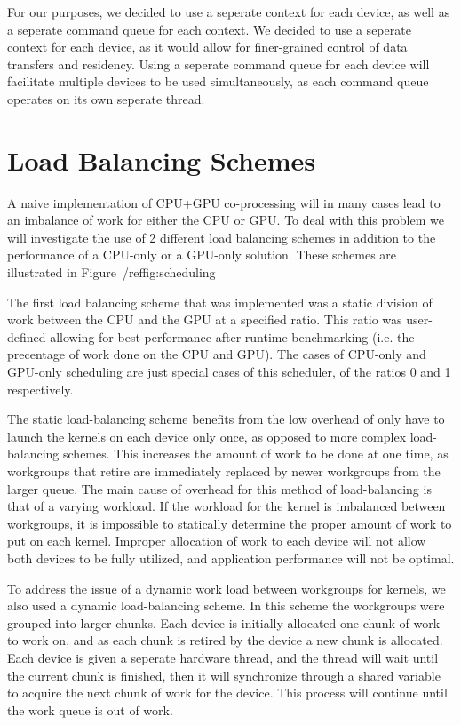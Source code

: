 \documentclass[journal]{IEEEtran}
\begin{document}
For our purposes, we decided to use a seperate context for each device, as well as a seperate
command queue for each context.  We decided to use a seperate context for each device, as it would
allow for finer-grained control of data transfers and residency. Using a seperate command queue
for each device will facilitate multiple devices to be used simultaneously, as each command queue
operates on its own seperate thread.

\section{Load Balancing Schemes}
A naive implementation of CPU+GPU co-processing will in many cases lead to an imbalance
of work for either the CPU or GPU.  To deal with this problem we will investigate the
use of 2 different load balancing schemes in addition to the performance of a CPU-only or
a GPU-only solution.  These schemes are illustrated in Figure~/ref{fig:scheduling}

The first load balancing scheme that was implemented was a static division of work between
the CPU and the GPU at a specified ratio.  This ratio was user-defined allowing for best 
performance after runtime benchmarking (i.e. the precentage of work done on the CPU and GPU).
The cases of CPU-only and GPU-only scheduling are just special cases of this scheduler, of
the ratios 0 and 1 respectively.

The static load-balancing scheme benefits from the low overhead of only have to launch the
kernels on each device only once, as opposed to more complex load-balancing schemes.  This
increases the amount of work to be done at one time, as workgroups that retire are immediately
replaced by newer workgroups from the larger queue. The main cause of overhead for this method
of load-balancing is that of a varying workload.  If the workload for the kernel is imbalanced
between workgroups, it is impossible to statically determine the proper amount of work
to put on each kernel.  Improper allocation of work to each device will not allow both
devices to be fully utilized, and application performance will not be optimal.

To address the issue of a dynamic work load between workgroups for kernels, we also used
a dynamic load-balancing scheme.  In this scheme the workgroups were grouped into larger
chunks.  Each device is initially allocated one chunk of work to work on, and as each chunk
is retired by the device a new chunk is allocated.  Each device is given a seperate hardware
thread, and the thread will wait until the current chunk is finished, then it will synchronize
through a shared variable to acquire the next chunk of work for the device.  This process
will continue until the work queue is out of work. 
\end{document}
